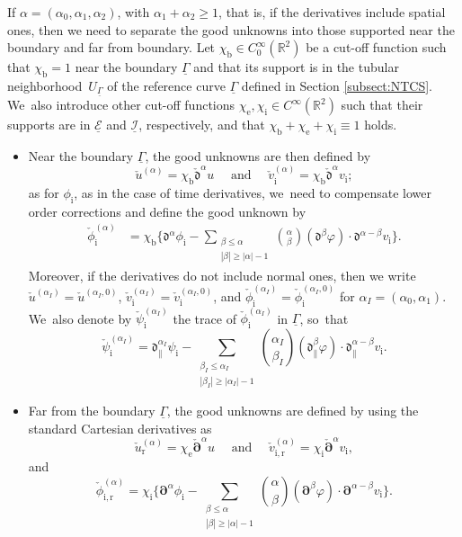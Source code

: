 \documentclass[JEP,XML,SOM,Unicode,NoFloatCountersInSection,published]{cedram}
\newcommand{\R}{{\mathbb R}}
\newcommand{\cI}{{\mathcal I}}
\newcommand{\cE}{{\mathcal E}}
\newcommand{\ul}[1]{\underline{#1}}
\newcommand{\itGamma}{\mathit{\Gamma}}
\newcommand{\cpalpha}{\check{\bm{\partial}}^{\alpha} }
\newcommand{\cmfalpha}{\check{\mathfrak{d}}^{\alpha}}
\theoremstyle{definition}
\begin{document}
If $\alpha=(\alpha_0,\alpha_1,\alpha_2)$, with $\alpha_1+\alpha_2\geq 1$, that is, if the derivatives include spatial ones,
then we need to separate the good unknowns into those supported near the boundary and far from boundary.
Let $\chi_\mathrm{b}\in C_0^\infty(\R^2)$ be a cut-off function such that $\chi_\mathrm{b}=1$ near the boundary $\ul{\itGamma}$ and that its support is in the
tubular neighborhood~$U_{\ul{\itGamma}}$ of the reference curve $\ul{\itGamma}$ defined in Section \ref{subsect:NTCS}. We~also introduce other cut-off functions $\chi_\mathrm{e},\chi_\mathrm{i}\in C^\infty(\R^2)$ such that their supports are in $\ul{\cE}$ and $\ul{\cI}$, respectively,
and that $\chi_\mathrm{b}+\chi_\mathrm{e}+\chi_\mathrm{i}\equiv1$ holds.
\begin{itemize}
\item
Near the boundary $\ul{\itGamma}$, the good unknowns are then defined by
\[
\check{u}^{(\alpha)} = \chi_\mathrm{b} \cmfalpha u
\quad\mbox{ and }\quad
\check{v}_\mathrm{i}^{(\alpha)} = \chi_\mathrm{b} \cmfalpha v_\mathrm{i};
\]
as for $\phi_\mathrm{i}$, as in the case of time derivatives, we~need to compensate lower order corrections and define the good unknown by
\begin{align*}
\check{\phi}_\mathrm{i}^{(\alpha)}
&= \chi_\mathrm{b} \biggl\{ \mathfrak{d}^{\alpha}\phi_\mathrm{i} - \sum_{\substack{\beta\leq\alpha\\ |\beta|\geq|\alpha|-1}} \binom{\alpha}{\beta}
(\mathfrak{d}^{\beta}\varphi)\cdot \mathfrak{d}^{\alpha-\beta}v_\mathrm{i} \biggr\}.
\end{align*}
Moreover, if the derivatives do not include normal ones, then we write $\check{u}^{(\alpha_I)}=\check{u}^{(\alpha_I,0)}$,
$\check{v}_\mathrm{i}^{(\alpha_I)}=\check{v}_\mathrm{i}^{(\alpha_I,0)}$,
and $\check{\phi}_\mathrm{i}^{(\alpha_I)}=\check{\phi}_\mathrm{i}^{(\alpha_I,0)}$ for $\alpha_I=(\alpha_0,\alpha_1)$. We~also denote by $\check\psi_\mathrm{i}^{(\alpha_{I})}$ the trace of $\check{\phi}_\mathrm{i}^{(\alpha_I)}$ in $\ul{\itGamma}$, so~that
\[
\check\psi_\mathrm{i}^{(\alpha_{I})}=\mathfrak{d}_\parallel^{\alpha_{I}}\psi_\mathrm{i} - \sum_{\substack{\beta_I\leq\alpha_I\\ |\beta_I|\geq|\alpha_I|-1}} \binom{\alpha_I}{\beta_I}
(\mathfrak{d}_\parallel^{\beta}\varphi)\cdot \mathfrak{d}_\parallel^{\alpha-\beta}v_\mathrm{i}.
\]
\item
Far from the boundary $\ul{\itGamma}$, the good unknowns are defined by using the standard Cartesian derivatives as
\[
\check{u}_\mathrm{r}^{(\alpha)} = \chi_\mathrm{e} \cpalpha u
\quad\mbox{ and }\quad
\check{v}_\mathrm{i,r}^{(\alpha)} = \chi_\mathrm{i}\cpalpha v_\mathrm{i},
\]
and
\[
\check{\phi}_\mathrm{i,r}^{(\alpha)}
= \chi_\mathrm{i} \biggl\{ \bm{\partial}^\alpha\phi_\mathrm{i} - \sum_{\substack{\beta\leq\alpha\\ |\beta|\geq|\alpha|-1}} \binom{\alpha}{\beta}
(\bm{\partial}^{\beta}\varphi)\cdot\bm{\partial}^{\alpha-\beta}v_\mathrm{i} \biggr\}.
\]
\end{itemize}
\end{document}
